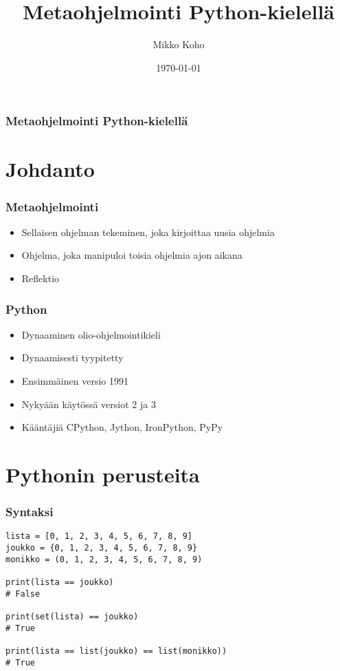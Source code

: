 \documentclass{beamer}
\title{Metaohjelmointi Python-kielellä}
\author{Mikko Koho}
\institute{Helsingin Yliopisto}
\date{\today}
\begin{document}
{
\begin{frame}
\maketitle
\end{frame}
}


\begin{frame}
  \frametitle{Metaohjelmointi Python-kielellä}
  \tableofcontents%
\end{frame}

\section{Johdanto}

\begin{frame}[fragile]
\frametitle{Metaohjelmointi}
\begin{itemize}
\item{Sellaisen ohjelman tekeminen, joka kirjoittaa uusia ohjelmia}
\item{Ohjelma, joka manipuloi toisia ohjelmia ajon aikana}
\item{Reflektio}
\end{itemize}
\end{frame}

\begin{frame}[fragile]
\frametitle{Python}
\begin{itemize}
\item{Dynaaminen olio-ohjelmointikieli}
\item{Dynaamisesti tyypitetty}
\item{Ensimmäinen versio 1991}
\item{Nykyään käytössä versiot 2 ja 3}
\item{Kääntäjiä CPython, Jython, IronPython, PyPy}
\end{itemize}
\end{frame}

\section{Pythonin perusteita}

\begin{frame}[fragile]
\frametitle{Syntaksi}
\begin{verbatim}
lista = [0, 1, 2, 3, 4, 5, 6, 7, 8, 9]
joukko = {0, 1, 2, 3, 4, 5, 6, 7, 8, 9}
monikko = (0, 1, 2, 3, 4, 5, 6, 7, 8, 9)

print(lista == joukko)
# False

print(set(lista) == joukko)
# True

print(lista == list(joukko) == list(monikko))
# True
\end{verbatim}
\end{frame}
\end{document}

